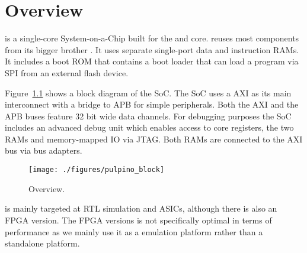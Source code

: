 \chapter{Overview}

\pulpino is a single-core System-on-a-Chip built for the \riscv \rvcore and \zerocore core.
\pulpino reuses most components from its bigger brother \pulp.
It uses separate single-port data and instruction RAMs. It includes a boot ROM
that contains a boot loader that can load a program via SPI from an external
flash device.

Figure~\ref{fig:pulpino_overview} shows a block diagram of the SoC.
The SoC uses a AXI as its main interconnect with a bridge to APB for simple
peripherals. Both the AXI and the APB buses feature 32 bit wide data channels.
For debugging purposes the SoC includes an advanced debug unit
which enables access to core registers, the two RAMs and memory-mapped IO via JTAG.
Both RAMs are connected to the AXI bus via bus adapters.

\begin{figure}[H]
  \centering
  \texttt{[image: ./figures/pulpino\_block]}
  \caption{\pulpino Overview.}
  \label{fig:pulpino_overview}
\end{figure}


\pulpino is mainly targeted at RTL simulation and ASICs, although there is also
an FPGA version. The FPGA versions is not specifically optimal in terms of
performance as we mainly use it as a emulation platform rather than a standalone
platform.
